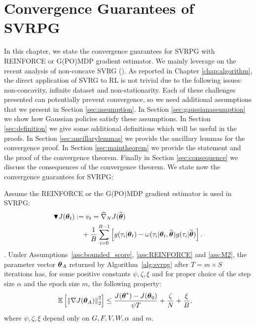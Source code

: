 \chapter{Convergence Guarantees of SVRPG} \label{chap:convergence}
In this chapter, we state the convergence guarantees for \acs{SVRPG}  with REINFORCE or G(PO)MDP gradient estimator.
We mainly leverage on the recent analysis of non-concave \acs{SVRG} (\cite{reddi2016stochastic,allen2016variance}).
As reported in Chapter \ref{chap:algorithm}, the direct application of \acs{SVRG} to \acs{RL} is not trivial due to the following issues: non-concavity, infinite dataset and non-stationarity.
Each of these challenges presented can potentially prevent convergence, so we need additional assumptions that we present in Section \ref{sec:assumption}. In Section \ref{sec:gaussianassumption} we show how Gaussian policies satisfy these assumptions. In Section \ref{sec:definition} we give some additional definitions which will be useful in the proofs. In Section \ref{sec:ancillarylemmas} we provide the ancillary lemmas for the convergence proof. In Section \ref{sec:maintheorem} we provide the statement and the proof of the convergence theorem. Finally in Section \ref{sec:consequence} we discuss the consequences of the convergence theorem.\newline
We state now the convergence guarantees for \acs{SVRPG}:

\begin{theorem}\label{theo:convergence}
	Assume the REINFORCE or the G(PO)MDP gradient estimator is used in SVRPG:
	\begin{align}
	\blacktriangledown J(\vtheta_{t}) &:= v_t= \wh{\nabla}_N J(\wt{\vtheta})\\ \notag
	& \quad{} + 
	\frac{1}{B} \sum_{i=0}^{B-1} \left[
	g(\tau_i|\vtheta_t) - \omega(\tau_i|\vtheta_t, \wt{\vtheta}) g(\tau_i|\wt{\vtheta})
	\right].
	\end{align}.
	Under Assumptions~\ref{ass:bounded_score}, \ref{ass:REINFORCE} and \ref{ass:M2}, the parameter vector $\vtheta_A$ returned by Algorithm~\ref{alg:svrpg} after $T=m\times S$ iterations has, for some positive constants $\psi,\zeta, \xi$ and for proper choice of the step size $\alpha$ and the epoch size $m$, the following property:
	\begin{align*}
	&\EVV[]
	{\norm[2]{\nabla J(\vtheta_A)}^2} 
	\leq
	\frac{J(\vtheta^*)-J(\vtheta_0)}{\psi T} +
	\frac{\zeta}{N}
	+\frac{\xi}{B},
	\end{align*}
	where $\psi,\zeta,\xi$ depend only on $\GRADLOG,\HESSLOG,\VARRF,\VARIS,\alpha$ and $m$.
\end{theorem}

